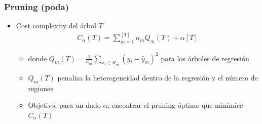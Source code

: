 \documentclass[
  shownotes,
  xcolor={svgnames},
  hyperref={colorlinks,citecolor=DarkBlue,linkcolor=andesred,urlcolor=DarkBlue}
  , aspectratio=169]{beamer}
\begin{document}
\begin{frame}[fragile]
\frametitle{Pruning (poda)}

\begin{itemize}
\item Cost complexity del árbol  $T$
\begin{align}
  C_{\alpha}(T)= \sum_{m=1}^{[T]} n_m Q_m (T) + \alpha [T]
\end{align}

  \begin{itemize}
  \item donde $Q_m (T)=\frac{1}{n_m} \sum_{x_i\in R_m} (y_i-\hat{y}_m)^2$ para los árboles de regresión
  \medskip
  \item  $Q_m (T)$ penaliza la heterogeneidad dentro de la regresión y el número de regiones 
  \medskip
  \item  Objetivo: para un dado $\alpha$, encontrar el pruning óptimo que minimice  $C_{\alpha}(T)$
  \end{itemize}
\end{itemize}
\end{frame}
\end{document}

